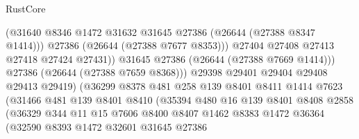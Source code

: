 \begin{lexlean}{RustCore}
\begin{coremodule}
                                      (@31640
                                        @8346
                                        @1472
                                        @31632
                                        @31645
                                        @27386
                                        (@26644 (@27388 @8347 @1414)))
                                      @27386
                                      (@26644 (@27388 @7677 @8353)))
                                    @27404
                                    @27408
                                    @27413
                                    @27418
                                    @27424
                                    @27431))
                                @31645
                                @27386
                                (@26644 (@27388 @7669 @1414)))
                              @27386
                              (@26644 (@27388 @7659 @8368)))
                            @29398
                            @29401
                            @29404
                            @29408
                            @29413
                            @29419)
                          (@36299
                            @8378
                            @481
                            @258
                            @139
                            @8401
                            @8411
                            @1414
                            @7623
                            (@31466
                              @481
                              @139
                              @8401
                              @8410
                              (@35394
                                @480
                                @16
                                @139
                                @8401
                                @8408
                                @2858
                                (@36329
                                  @344
                                  @11
                                  @15
                                  @7606
                                  @8400
                                  @8407
                                  @1462
                                  @8383
                                  @1472
                                  @36364
                                  (@32590
                                    @8393
                                    @1472
                                    @32601
                                    @31645
                                    @27386

\end{coremodule}
\end{lexlean}
